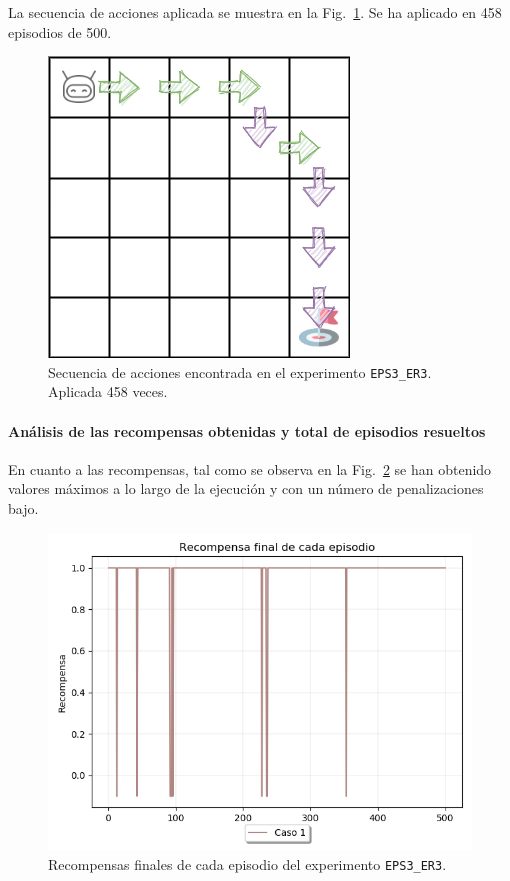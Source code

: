 La secuencia de acciones aplicada se muestra en la  Fig.~\ref{fig:dim5_lr0.01_ep0.2_EPS2_ER3}. Se ha aplicado en 458 episodios de 500. 

\begin{figure}
    \centering
    \includegraphics[scale=0.4]{cap5_experimentacion/images/dim5_lr0.01_ep0.2_458.png}
    \caption{Secuencia de acciones encontrada en el experimento \texttt{EPS3\_ER3}. Aplicada 458 veces.}
    \label{fig:dim5_lr0.01_ep0.2_EPS2_ER3}
\end{figure}

\paragraph{Análisis de las recompensas obtenidas y total de episodios resueltos} 

En cuanto a las recompensas, tal como se observa en la Fig.~\ref{fig:dim5_lr0.01_ep0.2_recompensa_EPS3_ER3} se han obtenido valores máximos a lo largo de la ejecución y con un número de penalizaciones bajo. \\
\begin{figure}
    \centering
    \includegraphics[scale=0.4]{cap5_experimentacion/images/dim5_lr0.01_ep0.2_recompensa.png}
    \caption{Recompensas finales de cada episodio del experimento \texttt{EPS3\_ER3}.}
    \label{fig:dim5_lr0.01_ep0.2_recompensa_EPS3_ER3}
\end{figure}

